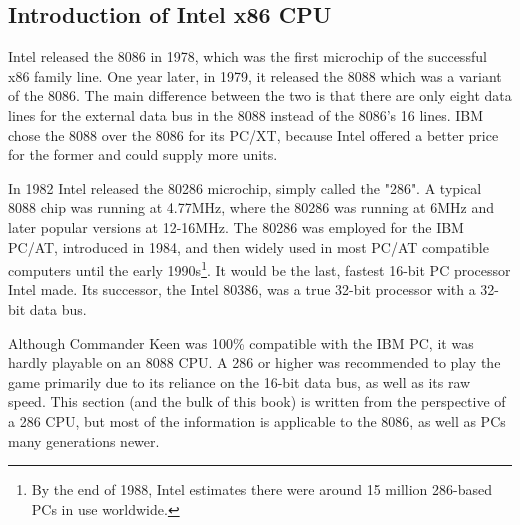 \documentclass[book.tex]{subfiles}
\begin{document}
\subsection{Introduction of Intel x86 CPU}
  Intel released the 8086 in 1978, which was the first microchip of the successful x86 family line. One year later, in 1979, it released the 8088 which was a variant of the 8086. The main difference between the two is that there are only eight data lines for the external data bus in the 8088 instead of the 8086's 16 lines.  IBM chose the 8088 over the 8086 for its PC/XT, because Intel offered a better price for the former and could supply more units. \\
  \par
  In 1982 Intel released the 80286 microchip, simply called the "286". A typical 8088 chip was running at 4.77MHz, where the 80286 was running at 6MHz and later popular versions at 12-16MHz. The 80286 was employed for the IBM PC/AT, introduced in 1984, and then widely used in most PC/AT compatible computers until the early 1990s\footnote{By the end of 1988, Intel estimates there were around 15 million 286-based PCs in use worldwide.}. It would be the last, fastest 16-bit PC processor Intel made. Its successor, the Intel 80386, was a true 32-bit processor with a 32-bit data bus.\\

 \par  
Although Commander Keen was 100\% compatible with the IBM PC, it was hardly playable on an 8088 CPU. A 286 or higher was recommended to play the game primarily due to its reliance on the 16-bit data bus, as well as its raw speed. This section (and the bulk of this book) is written from the perspective of a 286 CPU, but most of the information is applicable to the 8086, as well as PCs many generations newer.\\   
\end{document}
